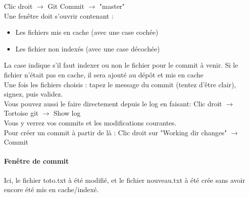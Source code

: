 Clic droit $\rightarrow$ Git Commit $\rightarrow$ "master"\\

Une fenêtre doit s'ouvrir contenant :
\begin{itemize}
\item Les fichiers mis en cache (avec une case cochée)
\item Les fichier non indexés (avec une case décochée)\\
\end{itemize}

La case indique s'il faut indexer ou non le fichier pour le commit à venir.
Si le fichier n'était pas en cache, il sera ajouté au dépôt et mis en cache\\

Une fois les fichiers choisis : tapez le message du commit (tentez d'être clair), signez, puis validez.\\

Vous pouvez aussi le faire directement depuis le log en faisant:
Clic droit $\rightarrow$ Tortoise git $\rightarrow$ Show log\\

Vous y verrez vos commits et les modifications courantes.\\
Pour créer un commit à partir de là : Clic droit sur "Working dir changes" $\rightarrow$ Commit
\newpage
\paragraph{Fenêtre de commit } Ici, le fichier toto.txt à été modifié, et le fichier nouveau.txt à été crée sans avoir encore été mis en cache/indexé.

